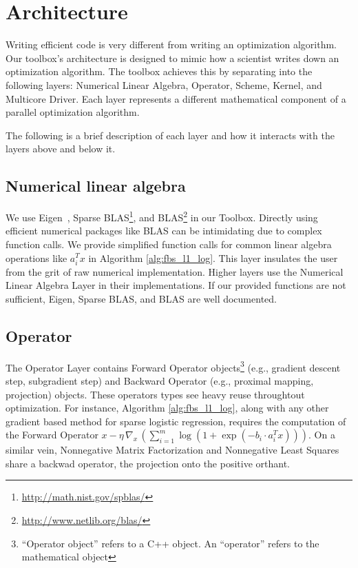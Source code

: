 \section{Architecture}


Writing efficient code is very different from writing an optimization algorithm.
Our toolbox's architecture is designed to mimic how a scientist writes down an optimization algorithm.
The toolbox achieves this by separating into the following layers: Numerical Linear Algebra, Operator, Scheme, Kernel, and Multicore Driver.
Each layer represents a different mathematical component of a parallel optimization algorithm.


The following is a brief description of each layer and how it interacts with the layers above and below it. 

\subsection{Numerical linear algebra}

We use Eigen~\citep{eigenweb}, Sparse BLAS\footnote{\url{http://math.nist.gov/spblas/}}, and BLAS\footnote{\url{http://www.netlib.org/blas/}} in our Toolbox.
Directly using efficient numerical packages like BLAS can be intimidating due to complex function calls. We provide simplified function calls for common linear algebra operations like $a_i^T x$ in Algorithm \ref{alg:fbs_l1_log}. This layer insulates the user from the grit of raw numerical implementation. Higher layers use the Numerical Linear Algebra Layer in their implementations.
If our provided functions are not sufficient, Eigen, Sparse BLAS, and BLAS are well documented. 

\subsection{Operator}

The Operator Layer contains Forward Operator objects\footnote{``Operator object'' refers to a C++ object. An ``operator'' refers to the mathematical object } (e.g., gradient descent step, subgradient step) and Backward Operator (e.g., proximal mapping, projection) objects. These operators types see heavy reuse throughtout optimization.
For instance, Algorithm \ref{alg:fbs_l1_log}, along with any other gradient based method for sparse logistic regression, requires the computation of the Forward Operator $x - \eta \, \nabla_x \,(\sum_{i = 1}^m \log (1 + \exp(-b_i \cdot a_i^T x)))$. On a similar vein, Nonnegative Matrix Factorization and Nonnegative Least Squares share a backwad operator, the projection onto the positive orthant.

